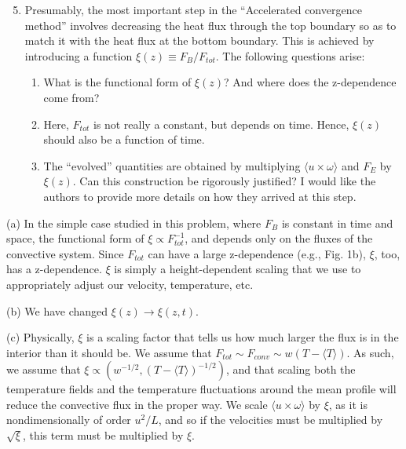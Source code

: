 \documentclass[aps, 11pt, singlecolumn]{revtex4-1} %
\begin{document}
\begin{singlespace}
\begin{myquotation}
$\,$\\\vspace{-1.25cm}
\begin{enumerate}
\setcounter{enumi}{4}
\item Presumably, the most important step in the “Accelerated convergence method” involves decreasing the heat flux through the top boundary so as to match it with the heat flux at the bottom boundary. This is achieved by introducing a function $\xi(z) \equiv  F_B/F_{tot}$. The following questions arise:
\begin{enumerate}
\item What is the functional form of $\xi(z)$? And where does the z-dependence come from?
\item Here, $F_{tot}$ is not really a constant, but depends on time. Hence, $\xi(z)$ should also be a function of time.
\item The ``evolved'' quantities are obtained by multiplying $\langle u \times \omega \rangle$ and $F_E$ by $\xi(z)$. Can this construction be rigorously justified? I would like the authors to provide more details on how they arrived at this step.
\end{enumerate}
\end{enumerate}
\end{myquotation}

(a) In the simple case studied in this problem, where $F_B$ is constant in time
and space, the functional form of $\xi \propto F_{tot}^{-1}$, and depends only
on the fluxes of the convective system. Since $F_{tot}$ can
have a large z-dependence (e.g., Fig. 1b), $\xi$, too, has a z-dependence. 
$\xi$ is simply a height-dependent scaling that we use to appropriately
adjust our velocity, temperature, etc.

(b) We have changed $\xi(z) \rightarrow \xi(z, t)$.

(c) Physically, $\xi$ is a scaling factor that tells us how much larger the flux
is in the interior than it should be. 
We assume that $F_{tot} \sim F_{conv} \sim w (T - \langle T \rangle )$.
As such, we assume that $\xi \propto (w^{-1/2}, (T - \langle T \rangle )^{-1/2})$,
and that scaling both the temperature fields and the temperature fluctuations 
around the mean profile will reduce the convective flux in the proper way.
We scale $\langle u\times \omega\rangle$ by $\xi$, as it is
nondimensionally of order $u^2 / L$, and so if the velocities must be multiplied
by $\sqrt{\xi}$, this term must be multiplied by $\xi$.


\end{singlespace}
\end{document}
